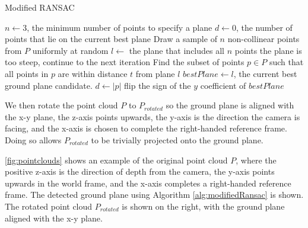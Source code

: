 \begin{algorithm}
\caption{Modified RANSAC}
\label{alg:modifiedRansac}
\begin{algorithmic}[1]
\Statex
{}
    \State $n \gets 3$, the minimum number of points to specify a plane
    \State $d \gets 0$, the number of points that lie on the current best plane
        \State Draw a sample of $n$ non-collinear points from $P$ uniformly at random
        \State $l \gets$ the plane that includes all $n$ points
            \State the plane is too steep, continue to the next iteration
        \EndIf
        \State Find the subset of points $p \in P$ such that all points in $p$ are
        within distance $t$ from plane $l$
            \State $bestPlane \gets l$, the current best ground plane candidate.
            \State $d \gets |p|$
        \EndIf
    \EndFor
        \State flip the sign of the $y$ coefficient of $bestPlane$ 
    \EndIf
\EndFunction
\Statex
{}
\end{algorithmic}
\end{algorithm}


We then rotate the point cloud $P$ to $P_{rotated}$ so the ground plane is
aligned with the x-y plane, the z-axis points upwards, the y-axis is the
direction the camera is facing, and the x-axis is chosen to complete the
right-handed reference frame. Doing so allows $P_{rotated}$ to be trivially
projected onto the ground plane.

\autoref{fig:pointclouds} shows an
example of the original point cloud $P$, where the positive z-axis is the
direction of depth from the camera, the y-axis points upwards in the world
frame, and the x-axis completes a right-handed reference frame. The detected
ground plane using Algorithm \ref{alg:modifiedRansac} is shown. The rotated
point cloud $P_{rotated}$ is shown on the right, with the ground plane aligned
with the x-y plane.

